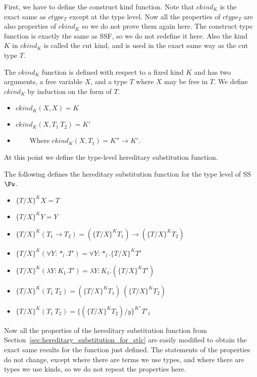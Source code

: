 First, we have to define the construct kind function.  Note that
$ckind_K$ is the exact same as $ctype_T$ except at the type level.
Now all the properties of $ctype_T$ are also properties of
$ckind_K$ so we do not prove them again here.  The construct type
function is exactly the same as SSF, so we do not redefine it here.
Also the kind $K$ in $ckind_K$ is called the cut kind, and is used in
the exact same way as the cut type $T$.
\begin{definition}
  \label{def:ctype_stlc}
  The $ckind_K$ function is defined with respect to a fixed kind $K$
  and has two arguments, a free variable $X$, and a type $T$ where $X$
  may be free in $T$.  We define $ckind_K$ by induction on the form of $T$.
\begin{itemize}
\item[] $ckind_K(X,X) = K$
  \item[] $ckind_K(X,T_1\ T_2) = K'$
  \item[] \ \ \ \ Where $ckind_K(X,T_1) = K'' \to K'$.
  \end{itemize}
\end{definition}
\noindent
At this point we define the type-level hereditary substitution function.
\begin{definition}
  \label{def:hereditary_substitution_function__type_level_ssfw}
  The following defines the hereditary substitution function for the
  type level of SS$\Fw$.  
  \begin{itemize}
  \item[] $\{T/X\}^K X = T$
  \item[] $\{T/X\}^K Y = Y$
  \item[] $\{T/X\}^K (T_1 \to T_2) = (\{T/X\}^K T_1) \to (\{T/X\}^K T_2)$
  \item[] $\{T/X\}^K (\forall Y:*_l.T') = \forall Y:*_l.\{T/X\}^K T'$
  \item[] $\{T/X\}^K (\lambda Y:K_1.T') = \lambda Y:K_1.(\{T / X\}^K T')$
  \item[] $\{T/X\}^K (T_1\ T_2) = (\{T/X\}^K T_1)\ (\{T/X\}^K T_2)$
  \item[] $\{T/X\}^{K} (T_1\ T_2) = \{(\{T/X\}^{K} T_2)/y\}^{K''} T'_1$
  \end{itemize}
\end{definition}
Now all the properties of the hereditary substitution function from
Section~\ref{sec:hereditary_substitution_for_stlc}
are easily modified to obtain the exact same results for the function
just defined.  The statements of the properties do not change, except
where there are terms we use types, and where there are types we use
kinds, so we do not repeat the properties here.  

